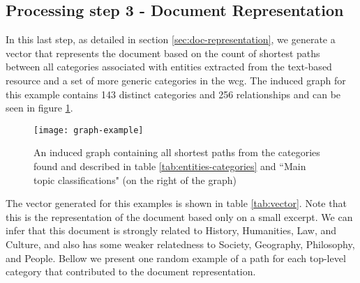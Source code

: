 \subsection{\hspace*{3pt} Processing step 3 - Document Representation}

In this last step, as detailed in section \ref{sec:doc-representation}, we generate a vector that represents the document based on the count of shortest paths between all categories associated with entities extracted from the text-based resource and a set of more generic categories in the \gls{wcg}. The induced graph for this example contains 143 distinct categories and 256 relationships and can be seen in figure \ref{fig:graph-example}.

 
\begin{figure}[H]
  \texttt{[image: graph-example]}
  \caption{An induced graph containing all shortest paths from the categories found and described in table \ref{tab:entities-categories} and ``Main topic classifications" (on the right of the graph)}
  \label{fig:graph-example}
\end{figure}


The vector generated for this examples is shown in table \ref{tab:vector}. Note that this is the representation of the document based only on a small excerpt. 
We can infer that this document is strongly related to History, Humanities, Law, and Culture, and also has some weaker relatedness to Society, Geography, Philosophy, and People. Bellow we present one random example of a path for each top-level category that contributed to the document representation.


